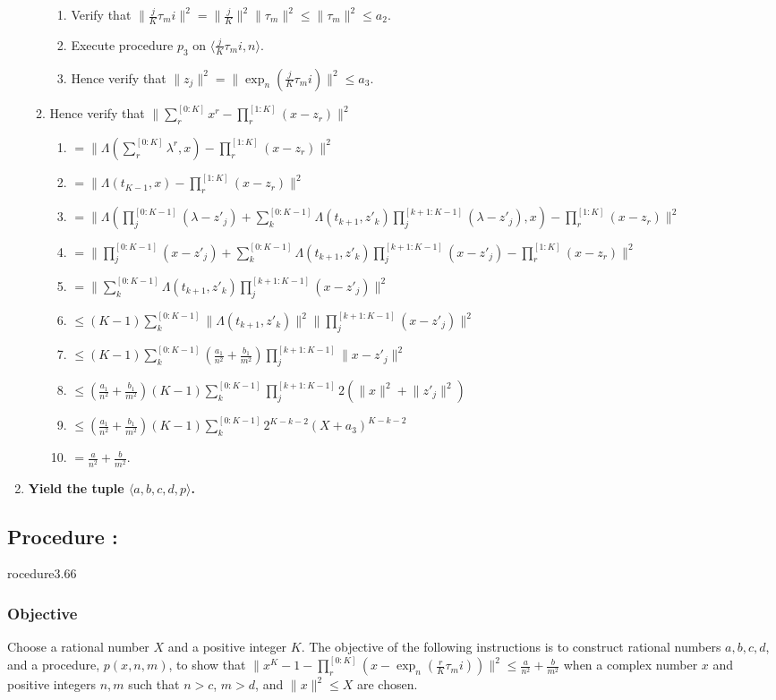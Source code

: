 \documentclass{article}
\newcounter{procedure}[part]
\newcommand{\procedure}[1]{\subsection*{Procedure \thepart:\theprocedure}\label{sec:procedure #1}\global\expandafter\edef\csname procedure#1\endcsname{\thepart:\theprocedure}\addtocounter{procedure}{1}}
\newcommand{\objective}{\subsubsection*{Objective}}
\begin{document}
\begin{multicols}{2}
\begin{enumerate}
\begin{enumerate}
\begin{enumerate}
							\item Verify that $\lVert\frac{j}{K}\tau_mi\rVert^2=\lVert\frac{j}{K}\rVert^2\lVert\tau_m\rVert^2\le\lVert\tau_m\rVert^2\le a_2$.
							\item Execute procedure $p_3$ on $\langle\frac{j}{K}\tau_mi,n\rangle$.
							\item Hence verify that $\lVert z_j\rVert^2=\lVert\exp_n(\frac{j}{K}\tau_mi)\rVert^2\le a_3$.
						\end{enumerate}
						\item Hence verify that $\lVert\sum_r^{[0:K]}x^r-\prod_r^{[1:K]}(x-z_r)\rVert^2$
						\begin{enumerate}
							\item $=\lVert\Lambda(\sum_r^{[0:K]}\lambda^r,x)-\prod_r^{[1:K]}(x-z_r)\rVert^2$
							\item $=\lVert\Lambda(t_{K-1},x)-\prod_r^{[1:K]}(x-z_r)\rVert^2$
							\item $=\lVert\Lambda(\prod_j^{[0:K-1]}(\lambda-z'_j)+\sum_k^{[0:K-1]}\Lambda(t_{k+1},z'_{k})\prod_j^{[k+1:K-1]}(\lambda-z'_j),x)-\prod_r^{[1:K]}(x-z_r)\rVert^2$
							\item $=\lVert\prod_j^{[0:K-1]}(x-z'_j)+\sum_k^{[0:K-1]}\Lambda(t_{k+1},z'_{k})\prod_j^{[k+1:K-1]}(x-z'_j)-\prod_r^{[1:K]}(x-z_r)\rVert^2$
							\item $=\lVert\sum_k^{[0:K-1]}\Lambda(t_{k+1},z'_{k})\prod_j^{[k+1:K-1]}(x-z'_j)\rVert^2$
							\item $\le(K-1)\sum_k^{[0:K-1]}\lVert\Lambda(t_{k+1},z'_{k})\rVert^2\lVert\prod_j^{[k+1:K-1]}(x-z'_j)\rVert^2$
							\item $\le(K-1)\sum_k^{[0:K-1]}(\frac{a_1}{n^2}+\frac{b_1}{m^2})\prod_j^{[k+1:K-1]}\lVert x-z'_j\rVert^2$
							\item $\le(\frac{a_1}{n^2}+\frac{b_1}{m^2})(K-1)\sum_k^{[0:K-1]}\prod_j^{[k+1:K-1]}2(\lVert x\rVert^2+\lVert z'_j\rVert^2)$
							\item $\le(\frac{a_1}{n^2}+\frac{b_1}{m^2})(K-1)\sum_k^{[0:K-1]}2^{K-k-2}(X+a_3)^{K-k-2}$
							\item $=\frac{a}{n^2}+\frac{b}{m^2}$.
						\end{enumerate}
					\end{enumerate}
					\item \textbf{Yield the tuple $\langle a,b,c,d,p\rangle$.}
				\end{enumerate}
		\procedure{3.66}
			\objective
				Choose a rational number $X$ and a positive integer $K$. The objective of the following instructions is to construct rational numbers $a,b,c,d$, and a procedure, $p(x,n,m)$, to show that $\lVert x^K-1-\prod_r^{[0:K]}(x-\exp_n(\frac{r}{K}\tau_mi))\rVert^2\le\frac{a}{n^2}+\frac{b}{m^2}$ when a complex number $x$ and positive integers $n,m$ such that $n>c$, $m>d$, and $\lVert x\rVert^2\le X$ are chosen.

\end{multicols}
\end{document}
